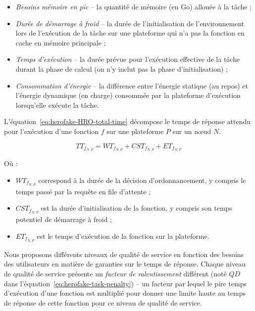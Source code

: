 \begin{itemize}
    \item \textit{Besoins mémoire en pic} -- la quantité de mémoire (en Go) allouée à la tâche ;
    \item \textit{Durée de démarrage à froid} -- la durée de l'initialisation de l'environnement lors de l'exécution de la tâche sur une plateforme qui n'a pas la fonction en cache en mémoire principale ;
    \item \textit{Temps d'exécution} -- la durée prévue pour l'exécution effective de la tâche durant la phase de calcul (on n'y inclut pas la phase d'initialisation) ;
    \item \textit{Consommation d'énergie} -- la différence entre l'énergie statique (au repos) et l'énergie dynamique (en charge) consommée par la plateforme d'exécution lorsqu'elle exécute la tâche.
\end{itemize}

L'équation~\ref{eq:herofake-HRO-total-time} décompose le temps de réponse attendu pour l'exécution d'une fonction $f$ sur une plateforme $P$ sur un nœud $N$.

\begin{equation}
    {TT}_{{f}_{N, P}} = {WT}_{{f}_{N, P}} + {CST}_{{f}_{N, P}} + {ET}_{{f}_{N, P}}
\label{eq:herofake-HRO-total-time}
\end{equation}

Où :

\begin{itemize}
    \item ${WT}_{{f}_{N, P}}$ correspond à la durée de la décision d'ordonnancement, y compris le temps passé par la requête en file d'attente ;
    \item ${CST}_{{f}_{N, P}}$ est la durée d'initialisation de la fonction, y compris son temps potentiel de démarrage à froid ;
    \item ${ET}_{{f}_{N, P}}$ est le temps d'exécution de la fonction sur la plateforme.
\end{itemize}

Nous proposons différents niveaux de qualité de service en fonction des besoins des utilisateurs en matière de garanties sur le temps de réponse. Chaque niveau de qualité de service présente un \textit{facteur de ralentissement} différent (noté $QD$ dans l'équation~\ref{eq:herofake-task-penalty}) -- un facteur par lequel le pire temps d'exécution d'une fonction est multiplié pour donner une limite haute au temps de réponse de cette fonction pour ce niveau de qualité de service.


